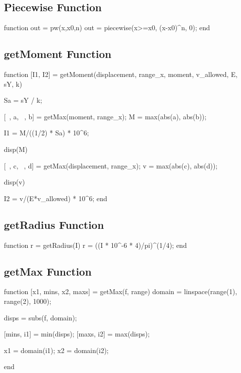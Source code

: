 \documentclass[a4paper]{article}
\begin{document}
\subsection{Piecewise Function}
\begin{verbatim*}
function out = pw(x,x0,n)
    out = piecewise(x>=x0, (x-x0)^n, 0);
end
\end{verbatim*}


\subsection{getMoment Function}
\begin{verbatim*}
function [I1, I2] = getMoment(displacement, range_x, moment, v_allowed, E, sY, k)
    
    Sa = sY / k;

    [~, a, ~, b] = getMax(moment, range_x);
    M = max(abs(a), abs(b));
    
    I1 = M/((1/2) * Sa) * 10^6;

    disp(M)

    [~, c, ~, d] = getMax(displacement, range_x);
    v = max(abs(c), abs(d));

    disp(v)

    I2 = v/(E*v_allowed) * 10^6;
end
\end{verbatim*}
\subsection{getRadius Function}
\begin{verbatim*}
function r = getRadius(I)
    r = ((I * 10^-6 * 4)/pi)^(1/4);
end
\end{verbatim*}


\subsection{getMax Function}
\begin{verbatim*}
function [x1, mins, x2, maxs] = getMax(f, range)
    domain = linspace(range(1), range(2), 1000);

    disps = subs(f, domain);

    [mins, i1] = min(disps);
    [maxs, i2] = max(disps);

    x1 = domain(i1);
    x2 = domain(i2);

end
\end{verbatim*}



\end{document}
